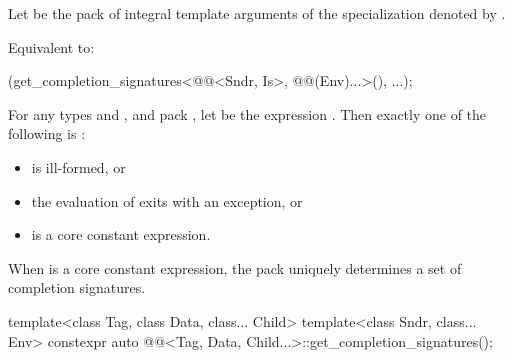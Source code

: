 \begin{itemdescr}
\pnum
Let  be the pack of integral template arguments of
the  specialization denoted by
.

\pnum
\effects
Equivalent to:
\begin{codeblock}
(get_completion_signatures<@@<Sndr, Is>, @@(Env)...>(), ...);
\end{codeblock}

\pnum
\begin{note}
For any types  and , and pack ,
let  be the expression
.
Then exactly one of the following is :
\begin{itemize}
\item {} is ill-formed, or
\item the evaluation of  exits with an exception, or
\item {} is a core constant expression.
\end{itemize}
When  is a core constant expression,
the pack  uniquely determines a set of completion signatures.
\end{note}
\end{itemdescr}

%
\begin{itemdecl}
template<class Tag, class Data, class... Child>
  template<class Sndr, class... Env>
    constexpr auto @@<Tag, Data, Child...>::get_completion_signatures();
\end{itemdecl}

